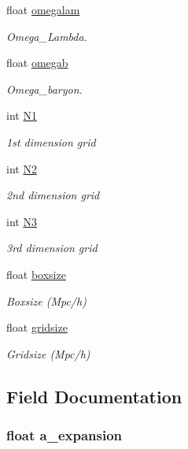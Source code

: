 \begin{DoxyCompactItemize}
float \hyperlink{structparams_ac99cfe381d57df39c2cdb6d5c8f6f548}{omegalam}
\begin{DoxyCompactList}\small\item\em Omega\+\_\+\+Lambda. \end{DoxyCompactList}\item 
float \hyperlink{structparams_aeaccd726adbb20f37e40458f9fc1789c}{omegab}
\begin{DoxyCompactList}\small\item\em Omega\+\_\+baryon. \end{DoxyCompactList}\item 
int \hyperlink{structparams_a5a6a26e0827f9640d2eb7201017f19d7}{N1}
\begin{DoxyCompactList}\small\item\em 1st dimension grid \end{DoxyCompactList}\item 
int \hyperlink{structparams_adeea8075a0038c985c63d45161804d60}{N2}
\begin{DoxyCompactList}\small\item\em 2nd dimension grid \end{DoxyCompactList}\item 
int \hyperlink{structparams_a4e8e9c2bf9e06ae07ef364c05a073302}{N3}
\begin{DoxyCompactList}\small\item\em 3rd dimension grid \end{DoxyCompactList}\item 
float \hyperlink{structparams_aec8643d101b2d4269bd09101195acde9}{boxsize}
\begin{DoxyCompactList}\small\item\em Boxsize (Mpc/h) \end{DoxyCompactList}\item 
float \hyperlink{structparams_a6d64c764749c83c38277585af5854d89}{gridsize}
\begin{DoxyCompactList}\small\item\em Gridsize (Mpc/h) \end{DoxyCompactList}\end{DoxyCompactItemize}


\subsection{Field Documentation}
\hypertarget{structparams_ab8ae1614d88a1fdcded37c8573053e9c}{
\subsubsection[{a\+\_\+expansion}]{\setlength{\rightskip}{0pt plus 5cm}float a\+\_\+expansion}}\label{structparams_ab8ae1614d88a1fdcded37c8573053e9c}


